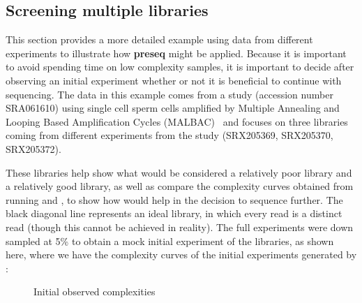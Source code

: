 \documentclass[11pt, titlepage]{article}
\begin{document}
\subsection*{Screening multiple libraries}
\label{sec:multlib}
This section provides a more detailed example using data from different experiments to illustrate how \textbf{preseq} might be applied. Because it is important to avoid spending time on low complexity samples, it is important to decide after observing an initial experiment whether or not it is beneficial to continue with sequencing. The data in this example comes from a study (accession number SRA061610) using single cell sperm cells amplified by Multiple Annealing and Looping Based Amplification Cycles (MALBAC)~\cite{lu2012probing} and focuses on three libraries coming from different experiments from the study (SRX205369, SRX205370, SRX205372). 

These libraries help show what would be considered a relatively poor library and a relatively good library, as well as compare the complexity curves obtained from running  and , to show how  would help in the decision to sequence further. The black diagonal line represents an ideal library, in which every read is a distinct read (though this cannot be achieved in reality). The full experiments were down sampled at 5\% to obtain a mock initial experiment of the libraries, as shown here, where we have the complexity curves  of the initial experiments generated by :
~\newline
\newline
\begin{figure}[h!]
\centering
{}
\caption{Initial observed complexities}
\end{figure}
\end{document}
